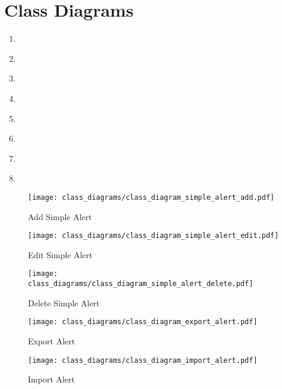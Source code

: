 \chapter{Class Diagrams}\label{ch:class_diagrams}

\begin{enumerate}
    \item~
    \item~
    \item~
    \item~
    \item~
    \item~
    \item~
    \item~
\end{enumerate}

\begin{figure}[]
	\centering
    \caption{Add Simple Alert}\label{fig:cls_simple_alert_add}
    \texttt{[image: class\_diagrams/class\_diagram\_simple\_alert\_add.pdf]}
\end{figure}

\begin{figure}[]
	\centering
    \caption{Edit Simple Alert}\label{fig:cls_simple_alert_edit}
    \texttt{[image: class\_diagrams/class\_diagram\_simple\_alert\_edit.pdf]}
\end{figure}

\begin{figure}[]
	\centering
    \caption{Delete Simple Alert}\label{fig:cls_simple_alert_delete}
    \texttt{[image: class\_diagrams/class\_diagram\_simple\_alert\_delete.pdf]}
\end{figure}

\begin{figure}[]
	\centering
    \caption{Export Alert}\label{fig:cls_export_alert}
    \texttt{[image: class\_diagrams/class\_diagram\_export\_alert.pdf]}
\end{figure}

\begin{figure}[]
	\centering
    \caption{Import Alert}\label{fig:cls_import_alert}
    \texttt{[image: class\_diagrams/class\_diagram\_import\_alert.pdf]}
\end{figure}

